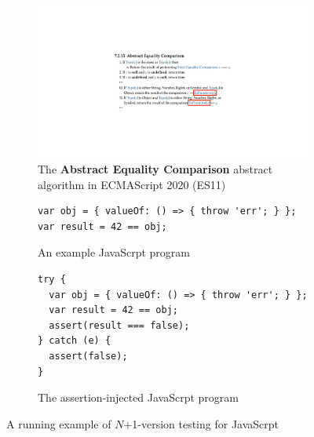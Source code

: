 \begin{figure}[t]
  \centering
  \centering
  \begin{subfigure}[t]{0.48\textwidth}
    \includegraphics[width=\textwidth]{img/example-algo.pdf}
    \caption{The \textbf{Abstract Equality Comparison} abstract algorithm in
    ECMAScript 2020 (ES11)}
    \label{fig:example-algo}
  \end{subfigure}
  \begin{subfigure}[t]{0.43\textwidth}
    \begin{lstlisting}[style=myJSstyle]
var obj = { valueOf: () => { throw 'err'; } };
var result = 42 == obj;
    \end{lstlisting}
    \caption{An example JavaScrpt program}
    \label{fig:example-js}
  \end{subfigure}
  \begin{subfigure}[t]{0.45\textwidth}
    \begin{lstlisting}[style=myJSstyle]
try {
  var obj = { valueOf: () => { throw 'err'; } };
  var result = 42 == obj;
  assert(result === false);
} catch (e) {
  assert(false);
}
    \end{lstlisting}
    \caption{The assertion-injected JavaScrpt program}
    \label{fig:example-injected}
  \end{subfigure}
  \caption{A running example of $N$+1-version testing for JavaScrpt}
  \label{fig:example}
  \vspace*{-1em}
\end{figure}

